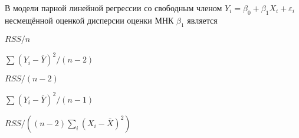 
\begin{question}
В модели парной линейной регрессии со свободным членом
\(Y_i = \beta_0 + \beta_1 X_i + \varepsilon_i\) несмещённой оценкой
дисперсии оценки МНК \(\hat\beta_1\) является
\begin{answerlist}
  \item \(RSS/n\)
  \item \(\sum (Y_i - \bar Y)^2 / (n-2)\)
  \item \(RSS/(n-2)\)
  \item \(\sum (Y_i - \bar Y)^2 / (n-1)\)
  \item \(RSS/((n-2)\sum_i (X_i - \bar X)^2)\)
\end{answerlist}
\end{question}


